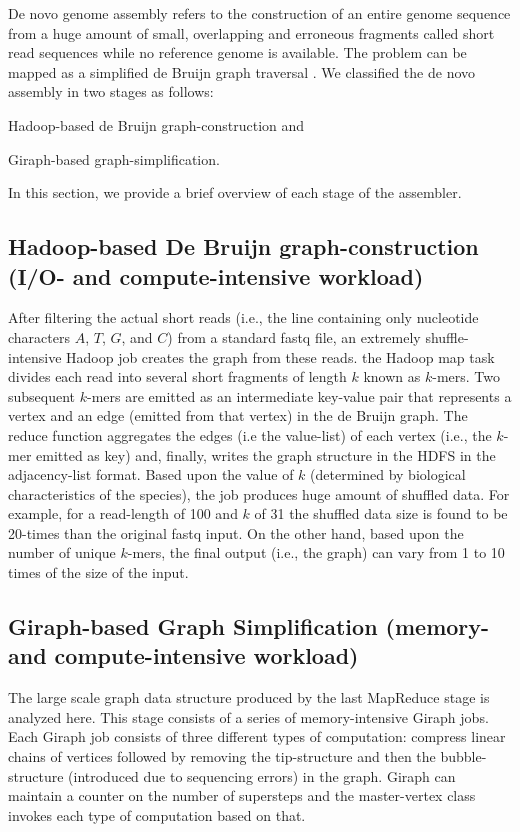 \documentclass[journal]{IEEEtran}
\begin{document}
De novo genome assembly refers to the construction of an entire genome sequence from a huge amount of small, overlapping and erroneous fragments called short read sequences while no reference genome is available. The problem can be mapped as a simplified de Bruijn graph traversal \cite{bio:debruijngraph}. We classified the de novo assembly in two stages as follows:
\begin{inparaenum}
\item Hadoop-based de Bruijn graph-construction and
\item Giraph-based graph-simplification.  
\end{inparaenum}
In this section, we provide a brief overview of each stage of the assembler. 

\subsection{Hadoop-based De Bruijn graph-construction (I/O- and compute-intensive workload)}
After filtering the actual short reads (i.e., the line containing only nucleotide characters $A$, $T$, $G$, and $C$) from a standard fastq file, an extremely shuffle-intensive Hadoop job creates the graph from these reads.  the Hadoop map task divides each read into several short fragments of length $k$ known as $k$-mers. Two subsequent $k$-mers are emitted as an intermediate key-value pair that represents  a vertex and an edge (emitted from that vertex) in the de Bruijn graph.  The reduce function aggregates the edges (i.e the value-list) of each vertex (i.e., the $k$-mer emitted as key) and, finally, writes the graph structure in the HDFS in the adjacency-list format. Based upon the value of $k$ (determined by biological characteristics of the species), the job produces huge amount of shuffled data. For example, for a read-length of 100 and $k$ of 31 the shuffled data size is found to be 20-times than the original fastq input. On the other hand, based upon the number of unique $k$-mers, the final output (i.e., the graph) can vary from 1 to 10 times of the size of the input. 

\subsection{Giraph-based Graph Simplification (memory- and compute-intensive workload)}
The large scale graph data structure produced by the last MapReduce stage is analyzed here. This stage consists of a series of memory-intensive Giraph jobs. Each Giraph job consists of three different types of computation: compress linear chains of vertices followed by removing the tip-structure and then the bubble-structure (introduced due to sequencing errors) in the graph. Giraph can maintain a counter on the number of supersteps and the master-vertex class invokes each type of computation based on that.
\end{document}
